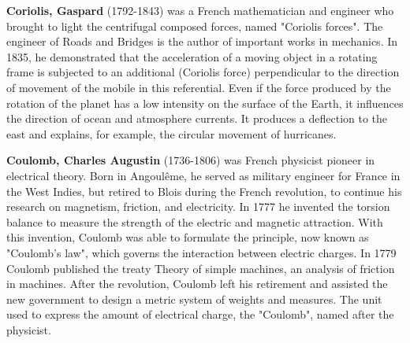 \textbf{Coriolis, Gaspard} (1792-1843) was a French mathematician and engineer who brought to light the centrifugal composed forces, named "Coriolis forces". The engineer of Roads and Bridges is the author of important works in mechanics. In 1835, he demonstrated that the acceleration of a moving object in a rotating frame is subjected to an additional (Coriolis force) perpendicular to the direction of movement of the mobile in this referential. Even if the force produced by the rotation of the planet has a low intensity on the surface of the Earth, it influences the direction of ocean and atmosphere currents. It produces a deflection to the east and explains, for example, the circular movement of hurricanes.

\textbf{Coulomb, Charles Augustin} (1736-1806) was  French physicist pioneer in electrical theory. Born in Angoulême, he served as military engineer for France in the West Indies, but retired to Blois during the French revolution, to continue his research on magnetism, friction, and electricity. In 1777 he invented the torsion balance to measure the strength of the electric and magnetic attraction. With this invention, Coulomb was able to formulate the principle, now known as "Coulomb's law", which governs the interaction between electric charges. In 1779 Coulomb published the treaty Theory of simple machines, an analysis of friction in machines. After the revolution, Coulomb left his retirement and assisted the new government to design a metric system of weights and measures. The unit used to express the amount of electrical charge, the "Coulomb", named after the physicist.

